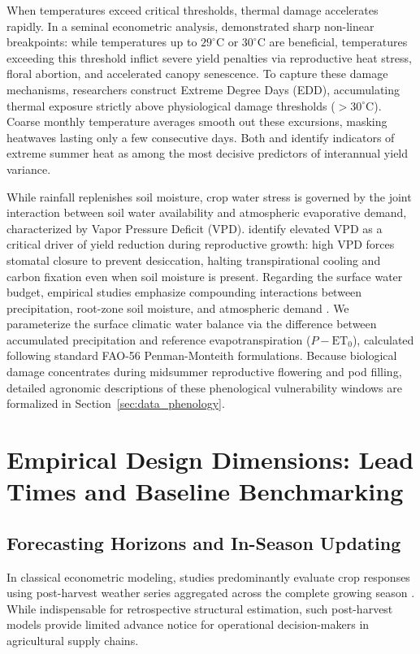 When temperatures exceed critical thresholds, thermal damage accelerates rapidly. In a seminal econometric analysis, \citet{Schlenker2009} demonstrated sharp non-linear breakpoints: while temperatures up to $29^\circ\text{C}$ or $30^\circ\text{C}$ are beneficial, temperatures exceeding this threshold inflict severe yield penalties via reproductive heat stress, floral abortion, and accelerated canopy senescence. To capture these damage mechanisms, researchers construct Extreme Degree Days (EDD), accumulating thermal exposure strictly above physiological damage thresholds ($>30^\circ\text{C}$). Coarse monthly temperature averages smooth out these excursions, masking heatwaves lasting only a few consecutive days. Both \citet{Hoffman2020} and \citet{ChenZhang2026} identify indicators of extreme summer heat as among the most decisive predictors of interannual yield variance.

While rainfall replenishes soil moisture, crop water stress is governed by the joint interaction between soil water availability and atmospheric evaporative demand, characterized by Vapor Pressure Deficit (VPD). \citet{Hoffman2020} identify elevated VPD as a critical driver of yield reduction during reproductive growth: high VPD forces stomatal closure to prevent desiccation, halting transpirational cooling and carbon fixation even when soil moisture is present. Regarding the surface water budget, empirical studies emphasize compounding interactions between precipitation, root-zone soil moisture, and atmospheric demand \citep{ChenZhang2026, Hoffman2020, Vijverberg2023}. We parameterize the surface climatic water balance via the difference between accumulated precipitation and reference evapotranspiration ($P - \text{ET}_0$), calculated following standard FAO-56 Penman-Monteith formulations. Because biological damage concentrates during midsummer reproductive flowering and pod filling, detailed agronomic descriptions of these phenological vulnerability windows are formalized in Section~\ref{sec:data_phenology}.

\section{Empirical Design Dimensions: Lead Times and Baseline Benchmarking}
\label{sec:lit_targets_lead_times}

\subsection{Forecasting Horizons and In-Season Updating}
In classical econometric modeling, studies predominantly evaluate crop responses using post-harvest weather series aggregated across the complete growing season \citep{Schlenker2009}. While indispensable for retrospective structural estimation, such post-harvest models provide limited advance notice for operational decision-makers in agricultural supply chains. 

